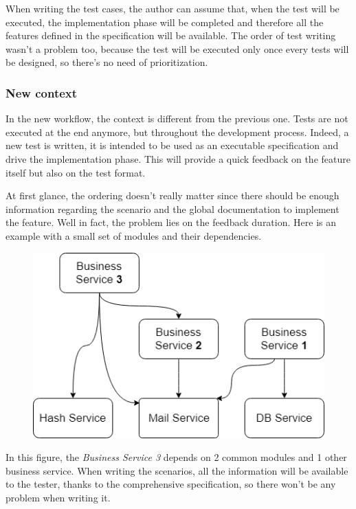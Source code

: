 When writing the test cases, the author can assume that, when the test will
be executed, the implementation phase will be completed and therefore all the
features defined in the specification will be available.
The order of test writing wasn't a problem too, because the test will be
executed only once every tests will be designed, so there's no need of
prioritization.

\subsubsection{New context}
In the new workflow, the context is different from the previous one.
Tests are not executed at the end anymore, but throughout the development
process.
Indeed, a new test is written, it is intended to be used as an executable
specification and drive the implementation phase.
This will provide a quick feedback on the feature itself but also on the test
format.

At first glance, the ordering doesn't really matter since there should be
enough information regarding the scenario and the global documentation to
implement the feature.
Well in fact, the problem lies on the feedback duration.
Here is an example with a small set of modules and their dependencies.

\begin{figure}
    \includegraphics[width=\textwidth]{../../resources/images/solution/module_dependencies.png}
    \centering
\end{figure}

In this figure, the \textit{Business Service 3} depends on 2 common modules
and 1 other business service.
When writing the scenarios, all the information will be available to the tester,
thanks to the comprehensive specification, so there won't be any problem when
writing it.

